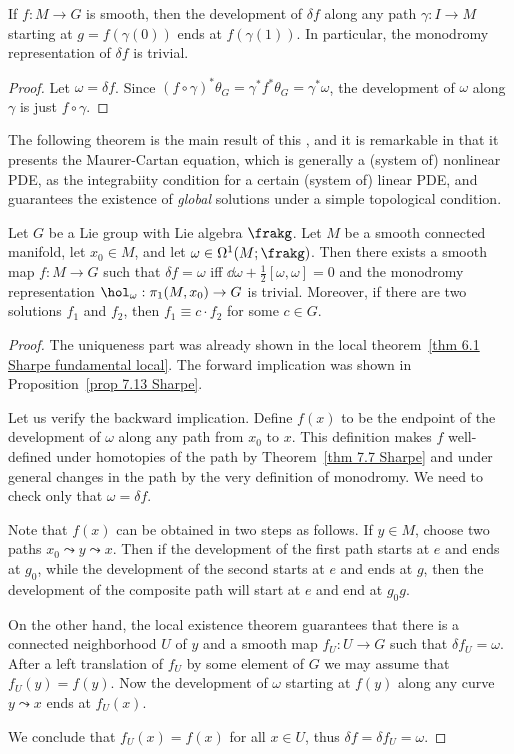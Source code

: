 \begin{prop}\label{prop 7.13 Sharpe}
    If $f:M\to G$ is smooth, then the development of $\delta f$ along any path $\gamma:I\to M$ starting at $g=f(\gamma(0))$ ends at $f(\gamma(1))$. In particular, the monodromy representation of $\delta f$ is trivial.
\end{prop}
\begin{proof}
    Let $\omega=\delta f$. Since $(f\circ \gamma)^\ast \theta_G=\gamma^\ast f^\ast\theta_G=\gamma^\ast\omega$, the development of $\omega$ along $\gamma$ is just $f\circ\gamma$.
\end{proof}

The following theorem is the main result of this \sect, and it is remarkable in that it presents the Maurer-Cartan equation, which is generally a (system of) nonlinear PDE, as the integrabiity condition for a certain (system of) linear PDE, and guarantees the existence of \emph{global} solutions under a simple topological condition.

\begin{thm}\label{thm 7.14 Sharpe fundamental global}
    Let $G$ be a Lie group with Lie algebra $\frakg$. Let $M$ be a smooth connected manifold, let $x_0\in M$, and let $\omega \in\Omega^1(M;\frakg)$. Then there exists a smooth map $f:M\to G$ such that $\delta f=\omega$ iff $\dd\omega+\frac12[\omega,\omega]=0$ and the monodromy representation $\hol_\omega:\pi_1(M,x_0)\to G$ is trivial. Moreover, if there are two solutions $f_1$ and $f_2$, then $f_1\equiv c\cdot f_2$ for some $c\in G$.
\end{thm}
\begin{proof}
    The uniqueness part was already shown in the local theorem~\ref{thm 6.1 Sharpe fundamental local}. The forward implication  was shown in Proposition~\ref{prop 7.13 Sharpe}.

    Let us verify the backward implication. Define $f(x)$ to be the endpoint of the development of $\omega$ along any path from $x_0$ to $x$. This definition makes $f$ well-defined under homotopies of the path by Theorem~\ref{thm 7.7 Sharpe} and under general changes in the path by the very definition of monodromy. We need to check only that $\omega=\delta f$.

    Note that $f(x)$ can be obtained in two steps as follows. If $y\in M$, choose two paths $x_0\leadsto y\leadsto x$. Then if the development of the first path starts at $e$ and ends at $g_0$, while the development of the second starts at $e$ and ends at $g$, then the development of the composite path will start at $e$ and end at $g_0g$. 
    
    On the other hand, the local existence theorem guarantees that there is a connected neighborhood $U$ of $y$ and a smooth map $f_U:U\to G$ such that $\delta f_U=\omega$. After a left translation of $f_U$ by some element of $G$ we may assume that $f_U(y)=f(y)$. Now the development of $\omega$ starting at $f(y)$ along any curve $y\leadsto x$ ends at $f_U(x)$. 
    
    We conclude that $f_U(x)=f(x)$ for all $x\in U$, thus $\delta f=\delta f_U=\omega$.
\end{proof}

